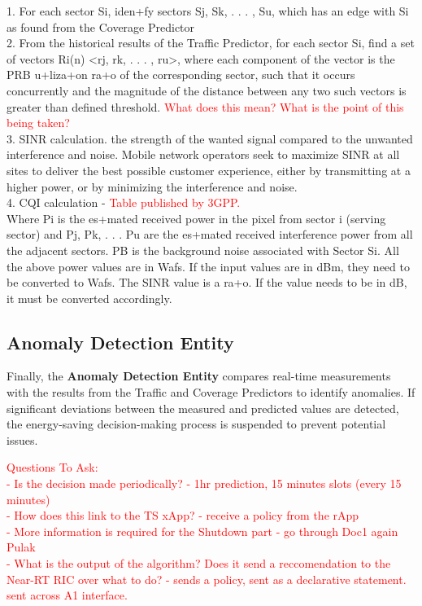 \documentclass[conference]{IEEEtran}
\begin{document}
1. For each sector Si, iden+fy sectors Sj, Sk, . . . , Su, which has an edge with Si as found from the Coverage Predictor \\
2. From the historical results of the Traffic Predictor, for each sector Si, find a set of vectors Ri(n) <rj, rk, . . . , ru>, where each component of the vector is the PRB u+liza+on ra+o of the corresponding sector, such that it occurs concurrently and the magnitude of the distance between any two such vectors is greater than defined threshold. \textcolor{red}{What does this mean? What is the point of this being taken?} \\

3. SINR calculation. the strength of the wanted signal compared to the unwanted interference and noise. Mobile network operators seek to maximize SINR at all sites to deliver the best possible customer experience, either by transmitting at a higher power, or by minimizing the interference and noise. \\

4. CQI calculation - \textcolor{red}{Table published by 3GPP.} \\

Where Pi is the es+mated received power in the pixel from sector i (serving sector) and Pj, Pk, . . . Pu are the es+mated received interference power from all the adjacent sectors. PB is the background noise associated with Sector Si. All the above power values are in Wafs. If the input values are in dBm, they need to be converted to Wafs. The SINR value is a ra+o. If the value needs to be in dB, it must be converted accordingly.

\subsection{Anomaly Detection Entity}

Finally, the \textbf{Anomaly Detection Entity} compares real-time measurements with the results from the Traffic and Coverage Predictors to identify anomalies. If significant deviations between the measured and predicted values are detected, the energy-saving decision-making process is suspended to prevent potential issues.

\textcolor{red}{
Questions To Ask: \\
- Is the decision made periodically? - 1hr prediction, 15 minutes slots (every 15 minutes) \\
- How does this link to the TS xApp? - receive a policy from the rApp \\
- More information is required for the Shutdown part - go through Doc1 again Pulak \\
- What is the output of the algorithm? Does it send a reccomendation to the Near-RT RIC over what to do? - sends a policy, sent as a declarative statement. sent across A1 interface. \\}
\end{document}
